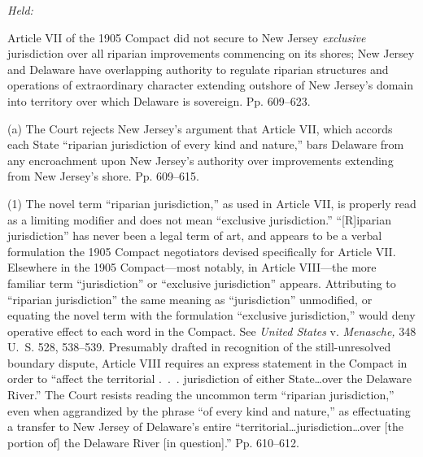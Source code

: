\emph{Held:}

\noindent Article VII of the 1905 Compact did not secure to New Jersey
\emph{exclusive} jurisdiction over all riparian improvements commencing
on its shores; New Jersey and Delaware have overlapping authority to
regulate riparian structures and operations of extraordinary character
extending outshore of New Jersey's domain into territory over which
Delaware is sovereign. Pp. 609--623.

  (a) The Court rejects New Jersey's argument that Article VII, which
accords each State ``riparian jurisdiction of every kind and nature,''
bars Delaware from any encroachment upon New Jersey's authority over
improvements extending from New Jersey's shore. Pp. 609--615.

  (1) The novel term ``riparian jurisdiction,'' as used in Article
VII, is properly read as a limiting modifier and does not mean
``exclusive jurisdiction.'' ``[R]iparian jurisdiction'' has never
been a legal term of art, and appears to be a verbal formulation
the 1905 Compact negotiators devised specifically for Article VII.
Elsewhere in the 1905 Compact---most notably, in Article VIII---the
more familiar term ``jurisdiction'' or ``exclusive jurisdiction''
appears. Attributing to ``riparian jurisdiction'' the same meaning
as ``jurisdiction'' unmodified, or equating the novel term with the
formulation ``exclusive jurisdiction,'' would deny operative effect
to each word in the Compact. See \emph{United States} v. \emph{Menasche,}
348 U.~S. 528, 538--539. Presumably drafted in recognition of the
still-unresolved boundary dispute, Article VIII requires an express
statement in the Compact in order to ``affect the territorial .~.~.
jurisdiction of either State\dots over the Delaware River.'' The
Court resists reading the uncommon term ``riparian jurisdiction,''
even when aggrandized by the phrase ``of every kind and nature,''
as effectuating a transfer to New Jersey of Delaware's entire
``territorial\dots jurisdiction\dots over [the portion of] the
Delaware River [in question].'' Pp. 610--612.

